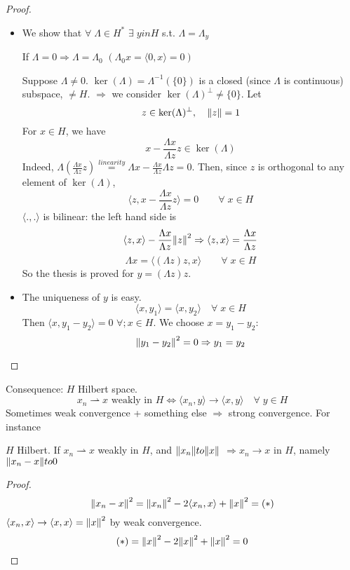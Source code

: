 \begin{proof}
    \begin{itemize}
        \item We show that \(\forall\; \Lambda \in H^* \) \(\exists\; y in H\) s.t. \(\Lambda = \Lambda_y\)
        
        If \(\Lambda = 0 \Rightarrow \Lambda = \Lambda_0\) \((\Lambda_0 x = \langle 0, x\rangle   = 0)\)

        Suppose \(\Lambda \neq 0. \) \(\ker(\Lambda) = \Lambda^{-1}(\{0\}) \) is a closed (since \(\Lambda\) is continuous) subspace, \(\neq H\). \(\Rightarrow\) we consider \(\ker(\Lambda)^\perp \neq \{0\}\). Let
        \[
            z \in \ker(\Lambda)^\perp, \quad \norm{z}=1
        \]
        For \(x \in H\), we have
        \[
            x - \frac{\Lambda x}{\Lambda z} z \in \ker(\Lambda)
        \]
        Indeed, \(\Lambda \left( \frac{\Lambda x}{\Lambda z} z \right) \overset{linearity}{=} \Lambda x - \frac{\Lambda x}{\Lambda z} \Lambda z = 0\). Then, since \(z\) is orthogonal to any element of \(\ker(\Lambda)\), 
        \[
            \langle z, x - \frac{\Lambda x}{\Lambda z} z\rangle   = 0 \qquad \forall\; x \in H
        \] 
        \(\langle .,.\rangle  \) is bilinear: the left hand side is 
        \[
            \langle z, x\rangle   - \frac{\Lambda x}{\Lambda z} \norm{z}^2 \Rightarrow \langle z, x\rangle   = \frac{\Lambda x}{\Lambda z} 
        \]
        \[
            \Lambda x = \langle (\Lambda z)z, x\rangle   \qquad \forall \; x \in H
        \]
        So the thesis is proved for \(y = (\Lambda z)z\).

        \item The uniqueness of \(y\) is easy.
        \[
            \langle x, y_1\rangle   = \langle x, y_2\rangle   \quad \forall \; x \in H
        \]
        Then \(\langle x, y_1-y_2\rangle   = 0\) \(\forall; x \in H\). We choose \(x = y_1 -y_2\):
        \[
            \norm{y_1 - y_2}^2 = 0 \Rightarrow y_1 = y_2
        \]
    \end{itemize}
\end{proof}

Consequence: \(H\) Hilbert space.
\[
    x_n \rightharpoonup x \text{ weakly in } H \iff \langle x_n, y\rangle   \to \langle x, y\rangle   \quad \forall\; y \in H
\]
Sometimes weak convergence + something else \(\Rightarrow\) strong convergence. For instance
\begin{proposition}
    \(H\) Hilbert. If \(x_n \rightharpoonup x\) weakly in \(H\), and \(\norm{x_n} to \norm{x}\) \(\Rightarrow x_n \to x\) in \(H\), namely \(\norm{x_n - x} to 0\)
\end{proposition}
\begin{proof}
    \[
        \norm{x_n - x }^2 = \norm{x_n}^2 - 2 \langle x_n, x\rangle   + \norm{x}^2 = (*)
    \]
    \(\langle x_n, x\rangle   \to \langle x, x\rangle   = \norm{x}^2 \) by weak convergence.
    \[
        (*) = \norm{x}^2 - 2 \norm{x}^2 + \norm{x}^2 = 0
    \]
\end{proof}

